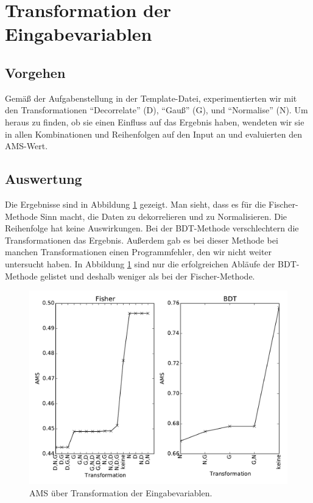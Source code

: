 \section{Transformation der Eingabevariablen}

\subsection{Vorgehen}
Gemäß der Aufgabenstellung in der Template-Datei, experimentierten wir mit den
Transformationen "`Decorrelate"' (D), "`Gauß"' (G), und "`Normalise"' (N).
Um heraus zu finden, ob sie einen Einfluss auf das Ergebnis haben, wendeten wir
sie in allen Kombinationen und Reihenfolgen auf den Input an und evaluierten den AMS-Wert.

\subsection{Auswertung}
Die Ergebnisse sind in Abbildung \ref{fig:ams_over_transforamtion} gezeigt. Man
sieht, dass es für die Fischer-Methode Sinn macht, die Daten zu dekorrelieren
und zu Normalisieren. Die Reihenfolge hat keine Auswirkungen. Bei der
BDT-Methode verschlechtern die Transformationen das Ergebnis. Außerdem gab es
bei dieser Methode bei manchen Transformationen einen Programmfehler, den wir
nicht weiter untersucht haben. In Abbildung \ref{fig:ams_over_transforamtion}
sind nur die erfolgreichen Abläufe der BDT-Methode gelistet und deshalb weniger
als bei der Fischer-Methode.





\begin{figure}[htp]
\begin{center}
  \includegraphics[width=\linewidth]{sections/input_transformations/var_transform_ranking.pdf}
  \caption[AMS über Transformation der Eingabevariablen]{AMS über Transformation der Eingabevariablen.}
  \label{fig:ams_over_transforamtion}
\end{center}
\end{figure}

